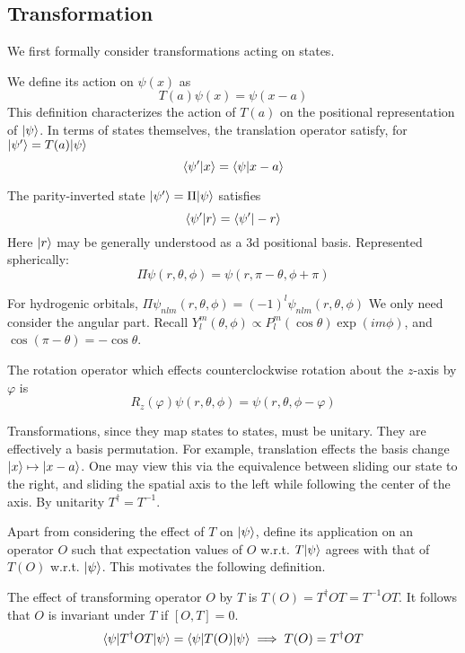 \subsection{Transformation}
We first formally consider transformations acting on states. 
\begin{definition}
    We define its action on $\psi(x)$ as 
    \[T(a)\psi(x)=\psi(x-a)\]
    This definition characterizes the action of $T(a)$ on the positional 
    representation of $|\psi\rangle$. In terms of states themselves, the translation 
    operator satisfy, for $|\psi'\rangle =T(a)|\psi\rangle$
    \[\langle \psi'|x\rangle = \langle \psi|x-a\rangle\]
\end{definition}
\begin{definition}
    The parity-inverted state $|\psi'\rangle = \Pi |\psi\rangle$ satisfies 
    \[\left\langle \psi'|r \right\rangle = \left\langle \psi'|-r \right\rangle\]
    Here $|r\rangle$ may be generally understood as a 3d positional basis. 
    Represented spherically:
    \[\Pi \psi(r, \theta, \phi) = \psi(r, \pi - \theta, \phi + \pi)\]
\end{definition}
\begin{proposition} For hydrogenic orbitals, 
    $\Pi \psi_{nlm}(r, \theta, \phi) = (-1)^l\psi_{nlm}(r, \theta, \phi)$
    We only need consider the angular part. Recall
    $Y_l^m(\theta, \phi)\propto P_l^m(\cos\theta)\exp(im\phi)$, 
    and $\cos(\pi - \theta)=-\cos\theta$.
\end{proposition}

\begin{definition}
    The rotation operator which effects counterclockwise rotation about the 
    $z$-axis by $\varphi$ is 
    \[ 
        R_z(\varphi)\psi(r, \theta, \phi)=\psi(r, \theta, \phi - \varphi)
    \] 
\end{definition}
Transformations, since they map states to states, must be unitary. 
They are effectively a basis permutation. For example, translation effects the 
basis change $|x\rangle \mapsto |x-a\rangle$. One may view this via the equivalence between 
sliding our state to the right, and sliding the spatial axis to the left while 
following the center of the axis. By unitarity $T^\dag = T^{-1}$. 

Apart from considering the effect of $T$ on $|\psi\rangle$,
define its application on an operator $O$ such that expectation values of 
$O$ w.r.t. $T|\psi\rangle$ agrees with that of $T(O)$ w.r.t. $|\psi\rangle$. This motivates 
the following definition. 
\begin{definition}
    The effect of transforming operator $O$ by $T$ is 
    $T(O)=T^\dag O T=T^{-1}OT$. It follows that $O$ is invariant under $T$ if $[O, T]=0$.
    \begin{equation}
        \langle \psi|T^\dag OT|\psi\rangle = \langle \psi|T(O)|\psi\rangle \implies T(O)=T^\dag OT
    \end{equation}
\end{definition}

